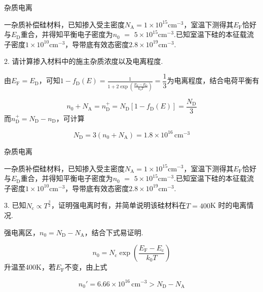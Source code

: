 \documentclass{beamer}
\begin{document}
\begin{frame}[t]{杂质电离}

    {\kaishu
        \qquad 一杂质补偿硅材料，已知掺入受主密度$N_\text{A} =1\times10^{15} \text{cm}^{-3}$，室温下测得其$E_\text{F}$恰好与$E_\text{D}$重合，并得知平衡电子密度为$n_0$ $=$ $5\times10^{15}\text{cm}^{-3}$.已知室温下硅的本征载流子密度$1\times10^{10}\text{cm}^{-3}$，导带底有效态密度$2.8\times10^{19}\text{cm}^{-3}$.\par
        \vspace{0.1cm}
        2. 请计算掺入材料中的施主杂质浓度以及电离程度.\par
    }
    \vspace{0.1cm}
    \qquad 由$E_{\text{F}}=E_{\text{D}}$，可知$1-f_{\text{D}}(E)=\frac{1}{1+2\exp  (\frac{E_{\text{F}}-E_{\text{D}}}{k_0 T} )} = \dfrac{1}{3}$为电离程度，结合电荷平衡有\par
    \vspace{-0.2cm}
    \[
        n_0+N_{\text{A}}=n_{\text{D}}^+ = N_{\text{D}}[1-f_{\text{D}}(E)] = \dfrac{N_{\text{D}}}{3}
    \]
    而$n_{\text{D}}^+ = N_{\text{D}} - n_{\text{D}}$，可计算\par
    \vspace{-0.2cm}
    \[
        N_\text{D}=3( n_0+N_\text{A} )=1.8\times10^{16} \, \text{cm}^{-3}
    \]
\end{frame}

\begin{frame}[t]{杂质电离}

    {\kaishu
        \qquad 一杂质补偿硅材料，已知掺入受主密度$N_\text{A} =1\times10^{15} \text{cm}^{-3}$，室温下测得其$E_\text{F}$恰好与$E_\text{D}$重合，并得知平衡电子密度为$n_0$ $=$ $5\times10^{15}\text{cm}^{-3}$.已知室温下硅的本征载流子密度$1\times10^{10}\text{cm}^{-3}$，导带底有效态密度$2.8\times10^{19}\text{cm}^{-3}$.\par
        \vspace{0.1cm}
        3. 已知$N_\text{c}\propto T^{\frac{3}{2}}$，证明强电离时有{}，并简单说明该硅材料在$T=400$K 时的电离情况.\par
    }
    \vspace{0.1cm}
    \qquad 强电离区，$n_0 = N_\text{D} - N_\text{A}$，结合下式易证明.\par
    \vspace{-0.2cm}
    \[
        n_0 = N_\text{c} \exp (\dfrac{E_\text{F}-E_\text{c}}{k_0 T})
    \]
    \qquad 升温至400K，若$E_\text{F}$不变，由上式\par
    \vspace{-0.2cm}
    \[
        n_0' = 6.66\times 10 ^{16} \, \text{cm}^{-3} > N_\text{D} - N_\text{A}
    \]
    
\end{frame}
\end{document}
